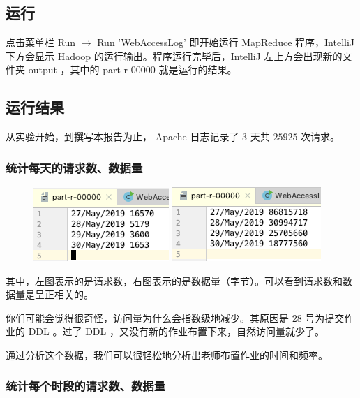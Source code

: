\documentclass{article}
\begin{document}
\newpage

\subsection{运行}

点击菜单栏 Run $\rightarrow$ Run 'WebAccessLog' 即开始运行 MapReduce 程序，IntelliJ 下方会显示 Hadoop 的运行输出。程序运行完毕后，IntelliJ 左上方会出现新的文件夹 output ，其中的 part-r-00000 就是运行的结果。

\subsection{运行结果}

从实验开始，到撰写本报告为止， Apache 日志记录了 $3$ 天共 $25925$ 次请求。

\subsubsection{统计每天的请求数、数据量}

\begin{figure}[!ht]
\centering
\includegraphics[scale=0.5]{image/10.png}
\includegraphics[scale=0.5]{image/11.png}
\end{figure}

其中，左图表示的是请求数，右图表示的是数据量（字节）。可以看到请求数和数据量是呈正相关的。

你们可能会觉得很奇怪，访问量为什么会指数级地减少。其原因是 $28$ 号为提交作业的 DDL 。过了 DDL ，又没有新的作业布置下来，自然访问量就少了。

通过分析这个数据，我们可以很轻松地分析出老师布置作业的时间和频率。

\newpage

\subsubsection{统计每个时段的请求数、数据量}
\end{document}
